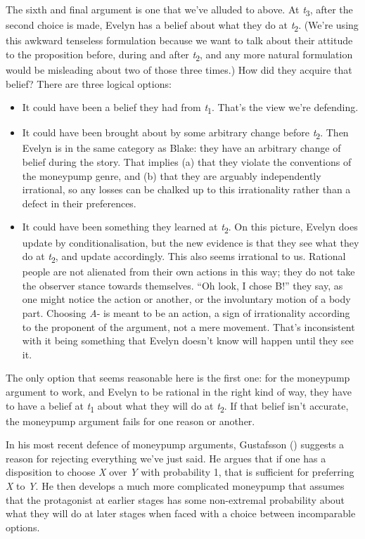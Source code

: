 \documentclass[
  11pt,
  letterpaper,
  DIV=11,
  numbers=noendperiod,
  twoside]{scrartcl}
\providecommand{\tightlist}{%
  \setlength{\itemsep}{0pt}\setlength{\parskip}{0pt}}\usepackage{longtable,booktabs,array}
\begin{document}
The sixth and final argument is one that we've alluded to above. At
\emph{t}\textsubscript{3}, after the second choice is made, Evelyn has a
belief about what they do at \emph{t}\textsubscript{2}. (We're using
this awkward tenseless formulation because we want to talk about their
attitude to the proposition before, during and after
\emph{t}\textsubscript{2}, and any more natural formulation would be
misleading about two of those three times.) How did they acquire that
belief? There are three logical options:

\begin{itemize}
\tightlist
\item
  It could have been a belief they had from \emph{t}\textsubscript{1}.
  That's the view we're defending.
\item
  It could have been brought about by some arbitrary change before
  \emph{t}\textsubscript{2}. Then Evelyn is in the same category as
  Blake: they have an arbitrary change of belief during the story. That
  implies (a) that they violate the conventions of the moneypump genre,
  and (b) that they are arguably independently irrational, so any losses
  can be chalked up to this irrationality rather than a defect in their
  preferences.
\item
  It could have been something they learned at
  \emph{t}\textsubscript{2}. On this picture, Evelyn does update by
  conditionalisation, but the new evidence is that they see what they do
  at \emph{t}\textsubscript{2}, and update accordingly. This also seems
  irrational to us. Rational people are not alienated from their own
  actions in this way; they do not take the observer stance towards
  themselves. ``Oh look, I chose B!'' they say, as one might notice the
  action or another, or the involuntary motion of a body part. Choosing
  \emph{A}- is meant to be an action, a sign of irrationality according
  to the proponent of the argument, not a mere movement. That's
  inconsistent with it being something that Evelyn doesn't know will
  happen until they see it.
\end{itemize}

The only option that seems reasonable here is the first one: for the
moneypump argument to work, and Evelyn to be rational in the right kind
of way, they have to have a belief at \emph{t}\textsubscript{1} about
what they will do at \emph{t}\textsubscript{2}. If that belief isn't
accurate, the moneypump argument fails for one reason or another.

In his most recent defence of moneypump arguments, Gustafsson
() suggests a reason for
rejecting everything we've just said. He argues that if one has a
disposition to choose \emph{X} over \emph{Y} with probability 1, that is
sufficient for preferring \emph{X} to \emph{Y}. He then develops a much
more complicated moneypump that assumes that the protagonist at earlier
stages has some non-extremal probability about what they will do at
later stages when faced with a choice between incomparable options.
\end{document}
